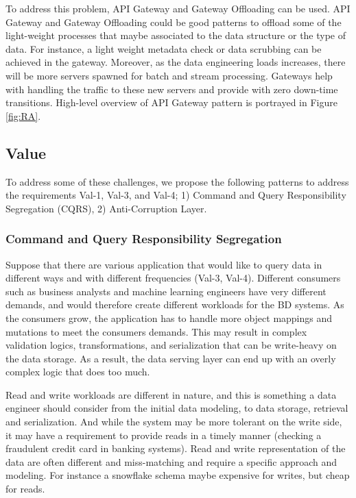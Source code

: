 \documentclass[a4paper,11pt,article,oneside]{memoir}
\begin{document}
To address this problem, API Gateway and Gateway Offloading can be used. API Gateway and Gateway Offloading could be good patterns to offload some of the light-weight processes that maybe associated to the data structure or the type of data. For instance, a light weight metadata check or data scrubbing can be achieved in the gateway. Moreover, as the data engineering loads increases, there will be more servers spawned for batch and stream processing. Gateways help with handling the traffic to these new servers and provide with zero down-time transitions. High-level overview of API Gateway pattern is portrayed in Figure \ref{fig:RA}.

\subsection{Value}

To address some of these challenges, we propose the following patterns to address the requirements Val-1, Val-3, and Val-4; 1) Command and Query Responsibility Segregation (CQRS), 2) Anti-Corruption Layer.

\subsubsection{Command and Query Responsibility Segregation}

Suppose that there are various application that would like to query data in different ways and with different frequencies (Val-3, Val-4). Different consumers such as business analysts and machine learning engineers have very different demands, and would therefore create different workloads for the BD systems. As the consumers grow, the application has to handle more object mappings and mutations to meet the consumers demands. This may result in complex validation logics, transformations, and serialization that can be write-heavy on the data storage. As a result, the data serving layer can end up with an overly complex logic that does too much. 

Read and write workloads are different in nature, and this is something a data engineer should consider from the initial data modeling, to data storage, retrieval and serialization. And while the system may be more tolerant on the write side, it may have a requirement to provide reads in a timely manner (checking a fraudulent credit card in banking systems). Read and write representation of the data are often different and miss-matching and require a specific approach and modeling. For instance a snowflake schema maybe expensive for writes, but cheap for reads. 
\end{document}
